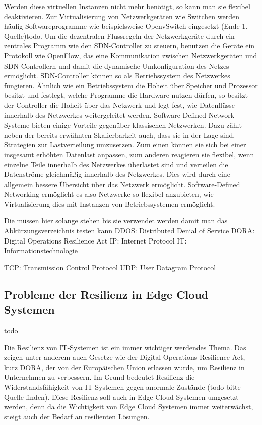 Werden diese virtuellen Instanzen nicht mehr benötigt, so kann man sie flexibel deaktivieren. Zur Virtualisierung von Netzwerkgeräten wie Switchen werden häufig Softwareprogramme wie beispielsweise OpenvSwitch eingesetzt (Ende 1. Quelle)todo. 
Um die dezentralen Flussregeln der Netzwerkgeräte durch ein zentrales Programm wie den SDN-Controller zu steuern, benutzen die Geräte ein Protokoll wie OpenFlow, 
das eine Kommunikation zwischen Netzwerkgeräten und SDN-Controllern und damit die dynamische Umkonfiguration des Netzes ermöglicht. SDN-Controller können so als Betriebssystem des Netzwerkes fungieren. 
Ähnlich wie ein Betriebssystem die Hoheit über Speicher und Prozessor besitzt und festlegt, welche Programme die Hardware nutzen dürfen, so besitzt der Controller die Hoheit über das Netzwerk und legt fest, 
wie Datenflüsse innerhalb des Netzwerkes weitergeleitet werden. Software-Defined Network-Systeme bieten einige Vorteile gegenüber klassischen Netzwerken. Dazu zählt neben der bereits erwähnten Skalierbarkeit auch, 
dass sie in der Lage sind, Strategien zur Lastverteilung umzusetzen. Zum einen können sie sich bei einer insgesamt erhöhten Datenlast anpassen, zum anderen reagieren sie flexibel, 
wenn einzelne Teile innerhalb des Netzwerkes überlastet sind und verteilen die Datenströme gleichmäßig innerhalb des Netzwerkes. Dies wird durch eine allgemein bessere Übersicht über das Netzwerk ermöglicht. 
Software-Defined Networking ermöglicht es also Netzwerke so flexibel anzubieten, wie Virtualisierung dies mit Instanzen von Betriebssystemen ermöglicht.





Die müssen hier solange stehen bis sie verwendet werden damit man das Abkürzungsverzeichnis testen kann
\ac{DDOS}: Distributed Denial of Service
\ac{DORA}: Digital Operations Resilience Act
\ac{IP}: Internet Protocol
\ac{IT}: Informationstechnologie

\ac{TCP}: Transmission Control Protocol
\ac{UDP}: User Datagram Protocol


\subsection{Probleme der Resilienz in Edge Cloud Systemen}

todo

Die Resilienz von IT-Systemen ist ein immer wichtiger werdendes Thema. Das zeigen unter anderem auch Gesetze wie der Digital Operations Resilience Act, kurz DORA, der von der Europäischen Union erlassen wurde, 
um Resilienz in Unternehmen zu verbessern. Im Grund bedeutet Resilienz die Widerstandsfähigkeit von IT-Systemen gegen anormale Zustände (todo bitte Quelle finden). 
Diese Resilienz soll auch in Edge Cloud Systemen umgesetzt werden, denn da die Wichtigkeit von Edge Cloud Systemen immer weiterwächst, steigt auch der Bedarf an resilienten Lösungen. 

